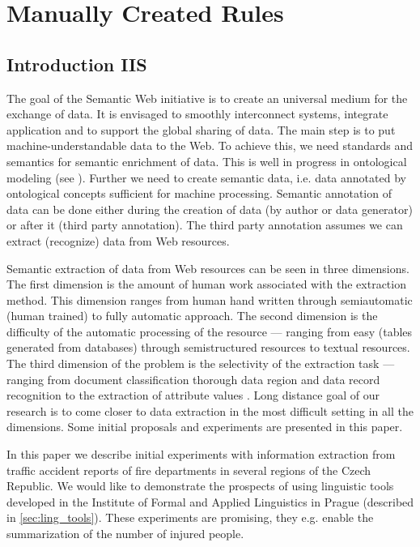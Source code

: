 \section{Manually Created Rules}
\subsection{Introduction IIS}
The goal of the Semantic Web initiative \citep{biblio:2001-Berners-Lee-SemanticWeb} is to create an universal medium for the exchange of data. It is envisaged to smoothly interconnect systems, integrate application and to support the global sharing of data. The main step is to put machine-understandable data to the Web. To achieve this, we need standards and semantics for semantic enrichment of data. This is well in progress in ontological modeling (see \citealt{biblio:OWL}). Further we need to create semantic data, i.e. data annotated by ontological concepts sufficient for machine processing. Semantic annotation of data can be done either during the creation of data (by author or data generator) or after it (third party annotation). The third party annotation assumes we can extract (recognize) data from Web resources. 

Semantic extraction of data from Web resources can be seen in three dimensions. The first dimension is the amount of human work associated with the extraction method. This dimension ranges from human hand written  through semiautomatic (human trained) to fully automatic approach. The second dimension is the difficulty of the automatic processing of the resource --- ranging from easy (tables generated from databases) through semistructured resources to textual resources. The third dimension of the problem is the selectivity of the extraction task --- ranging from document classification thorough data region and data record recognition to the extraction of attribute values \citep{biblio:Survey_of_Web_Information_Extraction_Systems}. Long distance goal of our research is to come closer to data extraction in the most difficult setting in all the dimensions. Some initial proposals and experiments are presented in this paper.

In this paper we describe initial experiments with information extraction from traffic accident reports of fire departments in several regions of the Czech Republic. We would like to demonstrate the prospects of using linguistic tools developed in the Institute of Formal and Applied Linguistics in Prague (described in \ref{sec:ling_tools}). These experiments are promising, they e.g. enable the summarization of the number of injured people. 

